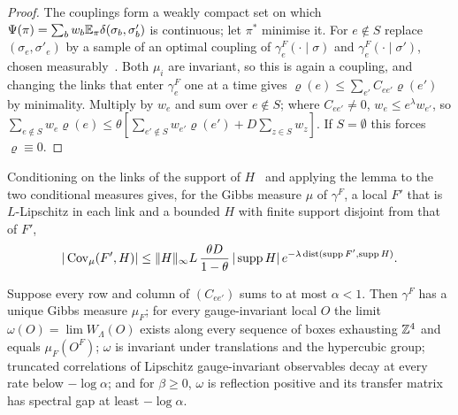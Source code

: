 \begin{proof}
The couplings form a weakly compact set on which $\Psi(\pi)=\sum_bw_b\mathbb{E}_\pi
\delta(\sigma_b,\sigma'_b)$ is continuous; let $\pi^*$ minimise it. For $e\notin S$
replace $(\sigma_e,\sigma'_e)$ by a sample of an optimal coupling of
$\gamma^F_e(\cdot\mid\sigma)$ and $\gamma^F_e(\cdot\mid\sigma')$, chosen
measurably~\cite[Cor.~5.22]{Vil09}. Both $\mu_i$ are invariant, so this is again
a coupling, and changing the links that enter $\gamma^F_e$ one at a time gives
$\varrho(e)\le\sum_{e'}C_{ee'}\varrho(e')$ by minimality. Multiply by $w_e$ and sum
over $e\notin S$; where $C_{ee'}\ne0$, $w_e\le e^\lambda w_{e'}$, so
$\sum_{e\notin S}w_e\varrho(e)\le\theta[\sum_{e'\notin S}w_{e'}\varrho(e')+D\sum_{z
\in S}w_z]$. If $S=\emptyset$ this forces $\varrho\equiv0$.
\end{proof}

Conditioning on the links of the support of $H$~\cite[Ch.~3]{Kal21} and
applying the lemma to the two conditional measures gives, for the Gibbs
measure $\mu$ of $\gamma^F$, a local $F'$ that is $L$-Lipschitz in each link and
a bounded $H$ with finite support disjoint from that of $F'$,
\begin{equation}\label{eq:decay}
|\operatorname{Cov}_\mu(F',H)|\le\|H\|_\infty L\,\frac{\theta D}{1-\theta}\,|\operatorname{supp}H|\,
e^{-\lambda\operatorname{dist}(\operatorname{supp}F',\operatorname{supp}H)} .
\end{equation}

\begin{proposition}\label{prop:state}
Suppose every row and column of $(C_{ee'})$ sums to at most $\alpha<1$. Then
$\gamma^F$ has a unique Gibbs measure $\mu_F$; for every gauge-invariant local $O$
the limit $\omega(O)=\lim W_\Lambda(O)$ exists along every sequence of boxes
exhausting $\mathbb{Z}^4$ and equals $\mu_F(O^F)$; $\omega$ is invariant under
translations and the hypercubic group; truncated correlations of Lipschitz
gauge-invariant observables decay at every rate below $-\log\alpha$; and for
$\beta\ge0$, $\omega$ is reflection positive and its transfer matrix has
spectral gap at least $-\log\alpha$.
\end{proposition}

